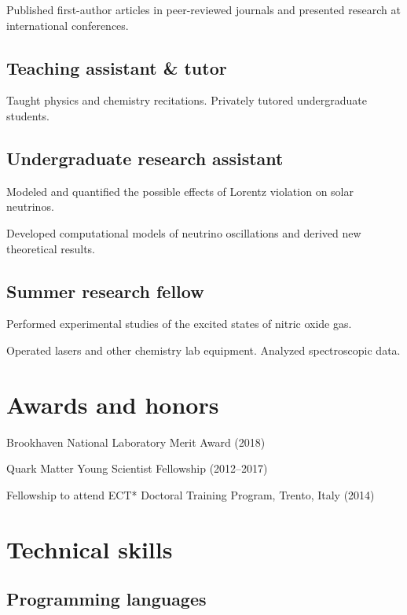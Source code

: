 \documentclass[letterpaper,10pt]{article}
\begin{document}
\begin{multicols}{2}
Published first-author articles in peer-reviewed journals and presented research at international conferences.

\subsection{Teaching assistant \& tutor}

Taught physics and chemistry recitations.
Privately tutored undergraduate students.

\subsection{Undergraduate research assistant}

Modeled and quantified the possible effects of Lorentz violation on solar neutrinos.

Developed computational models of neutrino oscillations and derived new theoretical results.

\subsection{Summer research fellow}

Performed experimental studies of the excited states of nitric oxide gas.

Operated lasers and other chemistry lab equipment.
Analyzed spectroscopic data.


\section{Awards and honors}

Brookhaven National Laboratory Merit Award (2018)

Quark Matter Young Scientist Fellowship (2012--2017)

Fellowship to attend ECT* Doctoral Training Program, Trento, Italy (2014)



\columnbreak


\section{Technical skills}

\subsection{Programming languages}


\end{multicols}
\end{document}

